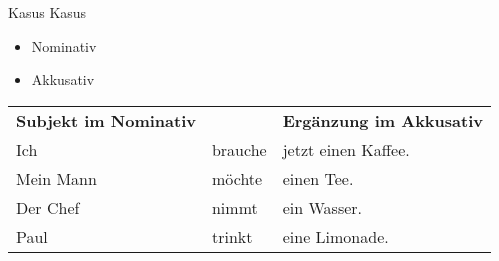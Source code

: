 \begin{syntax}{Kasus}{}
Kasus
\begin{itemize}
	\item Nominativ
	\item Akkusativ
\end{itemize}

\begin{mdframed}
	\begin{tabular}{l|l|l}
		\textbf{Subjekt im Nominativ}	& \verbhere	& \textbf{Ergänzung im Akkusativ} \\
		\bline
		Ich							  	& brauche	& jetzt einen Kaffee. \\
		Mein Mann						& möchte	& einen Tee. \\
		Der Chef						& nimmt		& ein Wasser. \\
		Paul							& trinkt	& eine Limonade.
	\end{tabular}
\end{mdframed}



\end{syntax}
